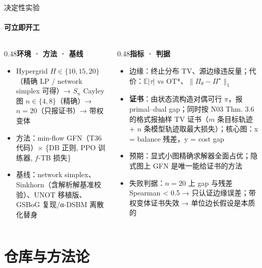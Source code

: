 \documentclass[aspectratio=169,10pt]{beamer}
\newcommand{\pos}[1]{\textcolor{positive}{#1}}
\newcommand{\con}[1]{\textcolor{negative}{#1}}
\begin{document}
\begin{frame}{决定性实验}\framesubtitle{可立即开工}
\begin{columns}[T]
\begin{column}{0.48\textwidth}\textbf{\pos{环境 · 方法 · 基线}}\vspace{2pt}
{\footnotesize\begin{itemize}
\item Hypergrid $H\in\{10,15,20\}$（精确 LP / network simplex 可得）→ $S_n$ Cayley 图 $n\in\{4,8\}$（精确）→ $n=20$（只报证书）→ 带权变体
\item 方法：min-flow GFN（T36 代码）× \{DB 正则, PPO 训练器, $f$-TB 损失\}
\item 基线：network simplex、Sinkhorn（含解析解基准校验）、UNOT 移植版、GSBoG 复现/α-DSBM 离散化替身
\end{itemize}}\end{column}
\hfill
\begin{column}{0.48\textwidth}\textbf{\pos{指标 · 判据}}\vspace{2pt}
{\footnotesize\begin{itemize}
\item 边缘：终止分布 TV、源边缘违反量；代价：$\mathbb E|\tau|$ vs OT*、$\|\Pi_\theta-\Pi^\star\|_1$
\item \textbf{证书}：由状态流构造对偶可行 $\pi$，报 primal–dual gap；同时按 N03 Thm. 3.6 的格式报抽样 TV 证书（$m$ 条目标轨迹 + $n$ 条模型轨迹取最大损失）；核心图：x = balance 残差，y = cost gap
\item 预期：显式小图精确求解器全面占优；隐式图上 GFN 是唯一能给证书的方法
\item \con{失败判据}：$n=20$ 上 gap 与残差 Spearman < 0.5 → 只认证边缘误差；带权变体证书失效 → 单位边长假设是本质的
\end{itemize}}\end{column}
\end{columns}
\end{frame}

\section{仓库与方法论}
\end{document}
